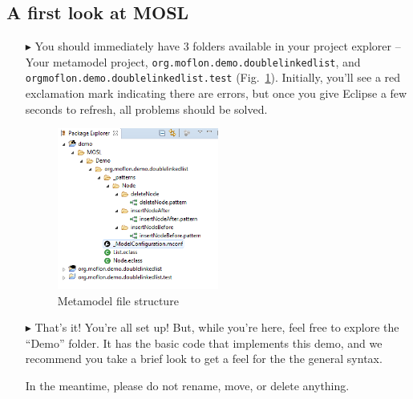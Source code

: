 \newpage
\texHeader
\hypertarget{simpleDemo tex}{} 
\subsection{A first look at MOSL}

\disclaimerForTextualSyntax

\begin{itemize}

\item[$\blacktriangleright$] You should immediately have 3 folders available in your project explorer -- Your metamodel project,
\texttt{org.moflon.demo.doublelinkedlist}, and \\ \texttt{orgmoflon.demo.doublelinkedlist.test} (Fig.~\ref{eclipse:texErrors}). Initially, you'll see a red exclamation mark indicating there
are errors, but once you give Eclipse a few seconds to refresh, all problems should be solved.

\vspace{1cm}

\begin{figure}[htp]
\begin{center}
  \includegraphics[width=0.5\textwidth]{eclipse_loadedTexDemo}
  \caption{Metamodel file structure}
  \label{eclipse:texErrors}
\end{center}
\end{figure}

\vspace{1cm}

\item[$\blacktriangleright$] That's it! You're all set up! But, while you're here, feel free to explore the ``Demo'' folder. It has the basic code that implements
this demo, and we recommend you take a brief look to get a feel for the the general syntax.

In the meantime, please do not rename, move, or delete anything.

\end{itemize}


